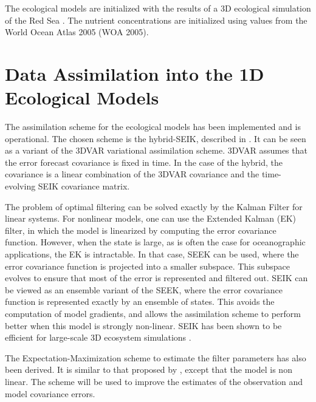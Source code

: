 The ecological models are initialized with the results of a 3D ecological
simulation of the Red Sea \citep{Triantafyllou2014}. The nutrient
concentrations are initialized using values from the World Ocean Atlas 2005
(WOA 2005).

\section{Data Assimilation into the 1D Ecological Models}

The assimilation scheme for the ecological models has been implemented and is
operational. The chosen scheme is the hybrid-SEIK, described in
\citet{Hamill2000}. It can be seen as a variant of the 3DVAR variational
assimilation scheme. 3DVAR assumes that the error forecast covariance is
fixed in time. In the case of the hybrid, the covariance is a linear combination
of the 3DVAR covariance and the time-evolving SEIK covariance matrix.

The problem of optimal filtering can be solved exactly by the Kalman Filter for
linear systems. For nonlinear models, one can use the Extended Kalman (EK)
filter, in which the model is linearized by computing the error covariance
function.  However, when the state is large, as is often the case for
oceanographic applications, the EK is intractable. In that case, SEEK can be
used, where the error covariance function is projected into a smaller subspace.
This subspace evolves to ensure that most of the error is represented and
filtered out. SEIK can be viewed as an ensemble variant of the SEEK, where the
error covariance function is represented exactly by an ensemble of states. This
avoids the computation of model gradients, and allows the assimilation scheme
to perform better when this model is strongly non-linear. SEIK has been shown
to be efficient for large-scale 3D ecosystem simulations
\citep{Triantfyllou2003}.

The Expectation-Maximization scheme to estimate the filter parameters has also
been derived. It is similar to that proposed by \citet{Tandeo2014}, 
except that the model is non linear. The scheme will be used to improve
the estimates of the observation and model covariance errors.
